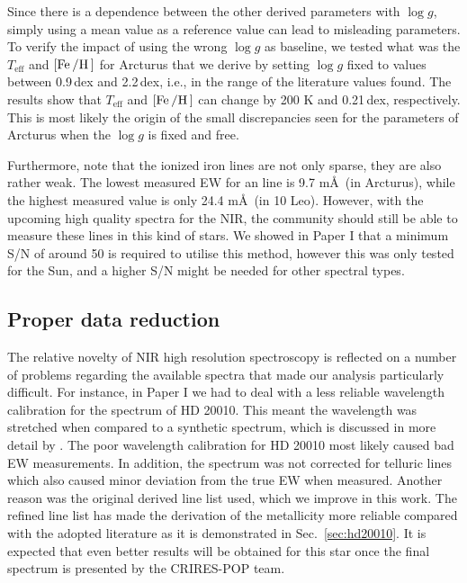 \documentclass[a4paper,fleqn,usenatbib]{mnras}
\begin{document}
Since there is a dependence between the other derived parameters with $\log g$,
simply using a mean value as a reference value can lead to misleading
parameters. To verify the impact of using the wrong $\log g$ as baseline, we
tested what was the $T_\mathrm{eff}$ and $[\ion{Fe}/\ion{H}]$ for Arcturus that we derive by
setting $\log g$ fixed to values between 0.9\,dex and 2.2\,dex, i.e., in the
range of the literature values found. The results show that $T_\mathrm{eff}$ and
$[\ion{Fe}/\ion{H}]$ can change by 200 K and 0.21\,dex, respectively.
This is most likely the origin of the small discrepancies seen for the
parameters of Arcturus when the $\log g$ is fixed and free.

Furthermore, note that the ionized iron lines are not only sparse, they are also
rather weak. The lowest measured EW for an  line is
9.7 m\AA\ (in Arcturus), while the highest measured value is only
24.4 m\AA\ (in 10 Leo). However, with the upcoming high quality spectra
for the NIR, the community should still be able to measure these 
lines in this kind of stars. We showed in Paper I that a minimum S/N of around 50 is required to
utilise this method, however this was only tested for the Sun, and a higher S/N
might be needed for other spectral types.


\subsection{Proper data reduction}

The relative novelty of NIR high resolution spectroscopy is reflected on a
number of problems regarding the available spectra that made our analysis
particularly difficult. For instance, in Paper I we had to deal with a less
reliable wavelength calibration for the spectrum of HD 20010. This meant the
wavelength was stretched when compared to a synthetic spectrum, which is
discussed in more detail by \citet{Nicholls2017}. The poor wavelength
calibration for HD 20010 most likely caused bad EW measurements. In addition,
the spectrum was not corrected for telluric lines which also caused minor
deviation from the true EW when measured. Another reason was the original
derived line list used, which we improve in this work. The refined line
list has made the derivation of the metallicity more reliable compared with the
adopted literature as it is demonstrated in Sec.~\ref{sec:hd20010}. It is
expected that even better results will be obtained for this star once the final
spectrum is presented by the CRIRES-POP team.
\end{document}
